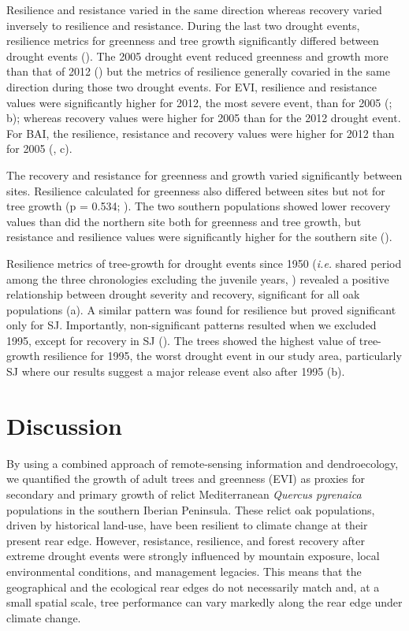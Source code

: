 Resilience and resistance varied in the same direction whereas recovery varied inversely to resilience and resistance. During the last two drought events, resilience metrics for greenness and tree growth significantly differed between drought events (). The 2005 drought event reduced greenness and growth more than that of 2012 () but the metrics of resilience generally covaried in the same direction during those two drought events. For EVI, resilience and resistance values were significantly higher for 2012, the most severe event, than for 2005 (; b); whereas recovery values were higher for 2005 than for the 2012 drought event. For BAI, the resilience, resistance and recovery values were higher for 2012 than for 2005 (, c).

The recovery and resistance for greenness and growth varied significantly between sites. Resilience calculated for greenness also differed between sites but not for tree growth (p = 0.534; ). The two southern populations showed lower recovery values than did the northern site both for greenness and tree growth, but resistance and resilience values were significantly higher for the southern site ().

Resilience metrics of tree-growth for drought events since 1950 (\emph{i.e.} shared period among the three chronologies excluding the juvenile years, ) revealed a positive relationship between drought severity and recovery, significant for all oak populations (a). A similar pattern was found for resilience but proved significant only for SJ. Importantly, non-significant patterns resulted when we excluded 1995, except for recovery in SJ (). The trees showed the highest value of tree-growth resilience for 1995, the worst drought event in our study area, particularly SJ where our results suggest a major release event also after 1995 (b).

\section{Discussion}\label{sec:dendro:Discussion}
By using a combined approach of remote-sensing information and dendroecology, we quantified the growth of adult trees and greenness (EVI) as proxies for secondary and primary growth of relict Mediterranean \emph{Quercus pyrenaica} populations in the southern Iberian Peninsula. These relict oak populations, driven by historical land-use, have been resilient to climate change at their present rear edge. However, resistance, resilience, and forest recovery after extreme drought events were strongly influenced by mountain exposure, local environmental conditions, and management legacies. This means that the geographical and the ecological rear edges do not necessarily match and, at a small spatial scale, tree performance can vary markedly along the rear edge under climate change.

